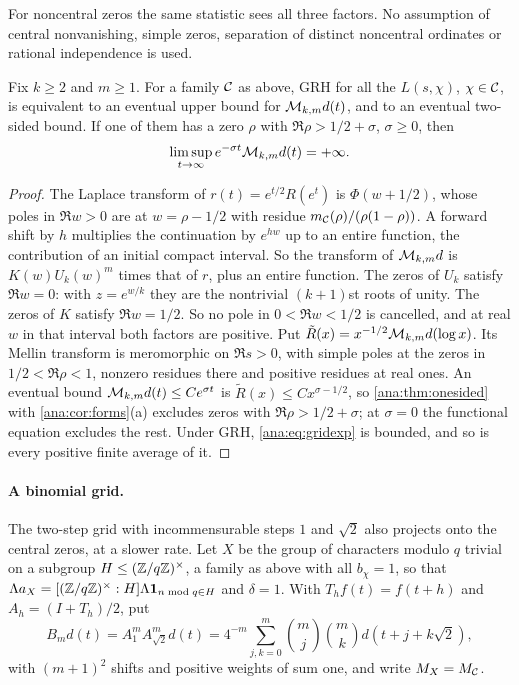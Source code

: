 For noncentral zeros the same statistic sees all three factors. No assumption of central
nonvanishing, simple zeros, separation of distinct noncentral ordinates or rational independence
is used.

\begin{theorem}\label{ana:thm:gridconverse}
Fix $k\ge2$ and $m\ge1$. For a family $\mathcal{C}$ as above, GRH for all the $L(s,\chi)$, $\chi\in\mathcal{C}$,
is equivalent to an eventual upper bound for $\mathcal{M}_{k,m}d(t)$, and to an eventual two-sided
bound. If one of them has a zero $\rho$ with $\Re\rho>1/2+\sigma$, $\sigma\ge0$, then
\[
 \limsup_{t\to\infty}e^{-\sigma t}\mathcal{M}_{k,m}d(t)=+\infty .
\]
\end{theorem}

\begin{proof}
The Laplace transform of $r(t)=e^{t/2}R(e^t)$ is $\Phi(w+1/2)$, whose poles in $\Re w>0$ are at
$w=\rho-1/2$ with residue $m_{\mathcal{C}}(\rho)/(\rho(1-\rho))$. A forward shift by $h$ multiplies the
continuation by $e^{hw}$ up to an entire function, the contribution of an initial compact
interval. So the transform of $\mathcal{M}_{k,m}d$ is $K(w)U_k(w)^m$ times that of $r$, plus an entire
function. The zeros of $U_k$ satisfy $\Re w=0$: with $z=e^{w/k}$ they are the nontrivial
$(k+1)$st roots of unity. The zeros of $K$ satisfy $\Re w=1/2$. So no pole in $0<\Re w<1/2$ is
cancelled, and at real $w$ in that interval both factors are positive. Put
$\tilde R(x)=x^{-1/2}\mathcal{M}_{k,m}d(\log x)$. Its Mellin transform is meromorphic on $\Re s>0$,
with simple poles at the zeros in $1/2<\Re\rho<1$, nonzero residues there and positive residues
at real ones. An eventual bound $\mathcal{M}_{k,m}d(t)\le Ce^{\sigma t}$ is
$\tilde R(x)\le Cx^{\sigma-1/2}$, so \cref{ana:thm:onesided} with \cref{ana:cor:forms}(a)
excludes zeros with $\Re\rho>1/2+\sigma$; at $\sigma=0$ the functional equation excludes the rest.
Under GRH, \eqref{ana:eq:gridexp} is bounded, and so is every positive finite average of it.
\end{proof}

\paragraph{A binomial grid.}
The two-step grid with incommensurable steps $1$ and $\sqrt2$ also projects onto the central
zeros, at a slower rate. Let $X$ be the group of characters modulo $q$ trivial on a subgroup
$H\le(\mathbb{Z}/q\mathbb{Z})^\times$, a family as above with all $b_\chi=1$, so that
$\Lambda a_X=[(\mathbb{Z}/q\mathbb{Z})^\times:H]\Lambda\mathbf{1}_{n\bmod q\in H}$ and $\delta=1$. With $T_hf(t)=f(t+h)$
and $A_h=(I+T_h)/2$, put
\[
 B_md(t)=A_1^mA_{\sqrt2}^md(t)=4^{-m}\sum_{j,k=0}^m\binom mj\binom mkd(t+j+k\sqrt2),
\]
with $(m+1)^2$ shifts and positive weights of sum one, and write $M_X=M_{\mathcal{C}}$.


